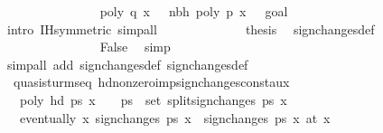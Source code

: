 \begin{isabellebody}
\ \ \ \ \ \ \ \ \ \ \ \ \ \ \isamarkupfalse%
\ {\isacharbackquoteopen}poly\ q\ x\ {\isasymnoteq}\ {}{\isacharbackquoteclose}\ nbh\ {\isacharbackquoteopen}poly\ p\ x\ {\isasymnoteq}\ {}{\isacharbackquoteclose}\ goal{}{\isacharparenleft}{}{\isacharparenright}\isanewline
\ \ \ \ \ \ \ \ \ \ \ \ \ \ \isamarkupfalse%
\ {\isacharparenleft}intro\ IH{\isacharparenleft}{}{\isacharparenright}{\isacharbrackleft}symmetric{\isacharbrackright}{\isacharcomma}\ simp{\isacharunderscore}all{\isacharparenright}\isanewline
\ \ \ \ \ \ \ \ \ \ \isamarkupfalse%
\ \isamarkupfalse%
\ {\isacharquery}thesis\ \isamarkupfalse%
\ sign{\isacharunderscore}changes{\isacharprime}{\isacharunderscore}def\ \isanewline
\ \ \ \ \ \ \ \ \ \ \ \ \ \ \isamarkupfalse%
\ False\ \isamarkupfalse%
\ simp\isanewline
\ \ \ \ \ \ \ \ \isamarkupfalse%
\isanewline
\ \ \ \ \isamarkupfalse%
\ {\isacharparenleft}simp{\isacharunderscore}all\ add{\isacharcolon}\ sign{\isacharunderscore}changes{\isacharunderscore}def\ sign{\isacharunderscore}changes{\isacharprime}{\isacharunderscore}def{\isacharparenright}\isanewline
\ \ \isamarkupfalse%
\isanewline
{}\isamarkupfalse%
%
\endisatagproof
{\isafoldproof}%
%
\isadelimproof
\isanewline
%
\endisadelimproof
\isanewline
\isanewline
\isanewline
{}\isamarkupfalse%
\ {\isacharparenleft}\ quasi{\isacharunderscore}sturm{\isacharunderscore}seq{\isacharparenright}\ hd{\isacharunderscore}nonzero{\isacharunderscore}imp{\isacharunderscore}sign{\isacharunderscore}changes{\isacharunderscore}const{\isacharunderscore}aux{\isacharcolon}\isanewline
\ \ \ {\isachardoublequoteopen}poly\ {\isacharparenleft}hd\ ps{\isacharparenright}\ x\ {\isasymnoteq}\ {}{\isachardoublequoteclose}\ \ {\isachardoublequoteopen}ps{\isacharprime}\ {\isasymin}\ set\ {\isacharparenleft}split{\isacharunderscore}sign{\isacharunderscore}changes\ ps\ x\isanewline
\ \ \ {\isachardoublequoteopen}eventually\ {\isacharparenleft}{\isasymlambda}x{\isachardot}\ sign{\isacharunderscore}changes\ ps{\isacharprime}\ x\ {\isacharequal}\ sign{\isacharunderscore}changes\ ps{\isacharprime}\ x\ {\isacharparenleft}at\ x\isanewline

\end{isabellebody}
